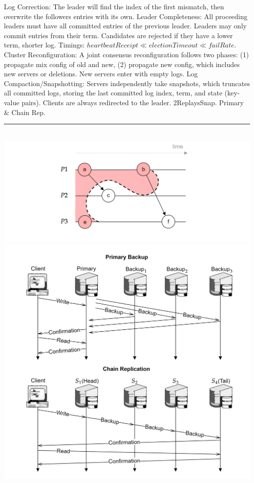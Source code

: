 \begin{multicols}{2}
    Log Correction: The leader will find the index of the first mismatch, then overwrite the followers entries with its own. Leader Completeness: All proceeding leaders must have all committed entries of the previous leader.
    Leaders may only commit entries from their term. Candidates are rejected if they have a lower term, shorter log. Timings: $heartbeatReceipt \ll electionTimeout \ll failRate$. 
    Cluster Reconfiguration: A joint consensus reconfiguration follows two phases: (1) propagate mix config of old and new, (2) propagate new config, which includes new servers or deletions. New servers
    enter with empty logs. Log Compaction/Snapshotting: Servers independently take snapshots, which truncates all committed logs, storing the last committed log index, term, and state (key-value pairs).
    Clients are always redirected to the leader. 2ReplaysSnap. Primary \& Chain Rep.\\
    \noindent
    \rule{\linewidth}{0.4pt}\\
    \includegraphics[width=\linewidth]{Sections/snap/snap_2.png}\\
    \vspace{-1.5em}
    \noindent
    \includegraphics[width=\linewidth]{Sections/rep/comp.png}\\
    
\end{multicols}

